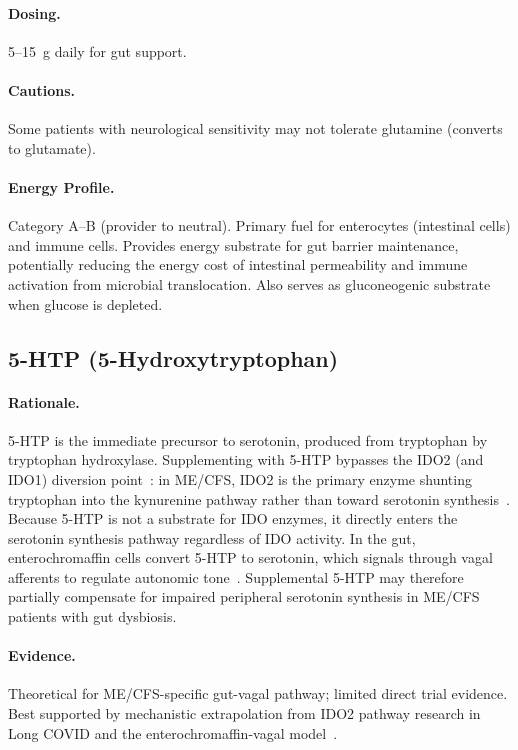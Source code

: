 \paragraph{Dosing.} 5--15~g daily for gut support.

\paragraph{Cautions.} Some patients with neurological sensitivity may not tolerate glutamine (converts to glutamate).

\paragraph{Energy Profile.}
Category A--B (provider to neutral). Primary fuel for enterocytes (intestinal cells) and immune cells. Provides energy substrate for gut barrier maintenance, potentially reducing the energy cost of intestinal permeability and immune activation from microbial translocation. Also serves as gluconeogenic substrate when glucose is depleted.

\subsection{5-HTP (5-Hydroxytryptophan)}
\label{sec:5-htp}

\paragraph{Rationale.} 5-HTP is the immediate precursor to serotonin, produced from tryptophan by tryptophan hydroxylase. Supplementing with 5-HTP bypasses the IDO2 (and IDO1) diversion point~\cite{WirthScheibenbogen2025Neurotransmitter}: in ME/CFS, IDO2 is the primary enzyme shunting tryptophan into the kynurenine pathway rather than toward serotonin synthesis~\cite{phair2019ido}. Because 5-HTP is not a substrate for IDO enzymes, it directly enters the serotonin synthesis pathway regardless of IDO activity. In the gut, enterochromaffin cells convert 5-HTP to serotonin, which signals through vagal afferents to regulate autonomic tone~\cite{Barton2025}. Supplemental 5-HTP may therefore partially compensate for impaired peripheral serotonin synthesis in ME/CFS patients with gut dysbiosis.

\paragraph{Evidence.} Theoretical for ME/CFS-specific gut-vagal pathway; limited direct trial evidence. Best supported by mechanistic extrapolation from IDO2 pathway research in Long COVID and the enterochromaffin-vagal model~\cite{WirthScheibenbogen2025Neurotransmitter}.

